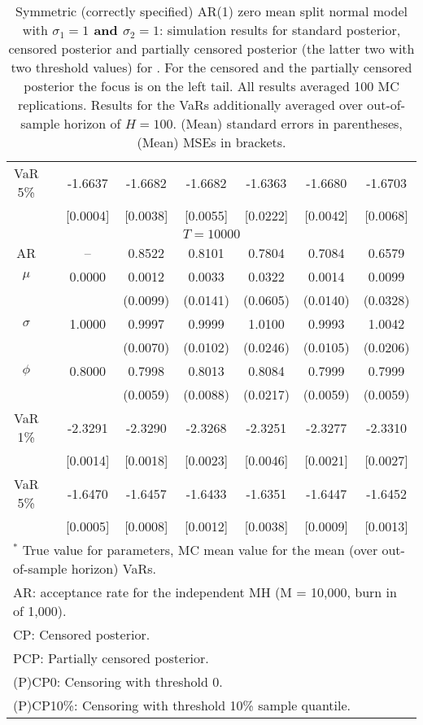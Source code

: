 {\begin{table}
\begin{tabular}{cc cccccc}
VaR 5\% && -1.6637 & -1.6682 & -1.6682 & -1.6363 & -1.6680 & -1.6703 \\ 
 && [0.0004] & [0.0038] & [0.0055] & [0.0222] & [0.0042] & [0.0068] \\ 
\hline 
\multicolumn{8}{c}{$T =10000$}  \\ 
\hline 
AR && -- & 0.8522 & 0.8101 & 0.7804 & 0.7084 & 0.6579 \\  
$\mu$&& 0.0000 & 0.0012 & 0.0033 & 0.0322 & 0.0014 & 0.0099 \\ 
&&   & (0.0099) & (0.0141) & (0.0605) & (0.0140) & (0.0328) \\ 
$\sigma$&& 1.0000 & 0.9997 & 0.9999 & 1.0100 & 0.9993 & 1.0042 \\ 
&&   & (0.0070) & (0.0102) & (0.0246) & (0.0105) & (0.0206) \\ 
$\phi$&& 0.8000 & 0.7998 & 0.8013 & 0.8084 & 0.7999 & 0.7999 \\ 
&&   & (0.0059) & (0.0088) & (0.0217) & (0.0059) & (0.0059) \\ 
VaR 1\% && -2.3291 & -2.3290 & -2.3268 & -2.3251 & -2.3277 & -2.3310 \\ 
  && [0.0014] & [0.0018] & [0.0023] & [0.0046] & [0.0021] & [0.0027] \\ 
VaR 5\% && -1.6470 & -1.6457 & -1.6433 & -1.6351 & -1.6447 & -1.6452 \\ 
 && [0.0005] & [0.0008] & [0.0012] & [0.0038] & [0.0009] & [0.0013] \\ 
\hline 
\multicolumn{8}{l}{\footnotesize{$^*$ True value for parameters, MC mean value for the mean (over out-of-sample horizon) VaRs.}}  \\ 
\multicolumn{8}{l}{\footnotesize{AR: acceptance rate for the independent MH (M = 10,000, burn in of 1,000).}}  \\ 
\multicolumn{8}{l}{\footnotesize{CP: Censored posterior.}}  \\ 
\multicolumn{8}{l}{\footnotesize{PCP: Partially censored posterior.}} \\ 
\multicolumn{8}{l}{\footnotesize{(P)CP0: Censoring with threshold 0.}} \\ 
\multicolumn{8}{l}{\footnotesize{(P)CP10\%: Censoring with threshold 10\% sample quantile.}}  \\ 
\end{tabular}
 \caption{Symmetric (correctly specified) AR(1) zero mean split normal model with \textbf{$\sigma_{1} = 1$ and $\sigma_{2} = 1$}: simulation results for standard posterior, censored posterior and partially censored posterior (the latter two with two threshold values) for . For the censored and the partially censored posterior the focus is on the left tail. All results averaged 100 MC replications. Results for the VaRs additionally averaged over out-of-sample horizon of $H=100$. (Mean) standard errors in parentheses, (Mean) MSEs in brackets.} 
\label{tab:ar1_pcp}  
\end{table}
}